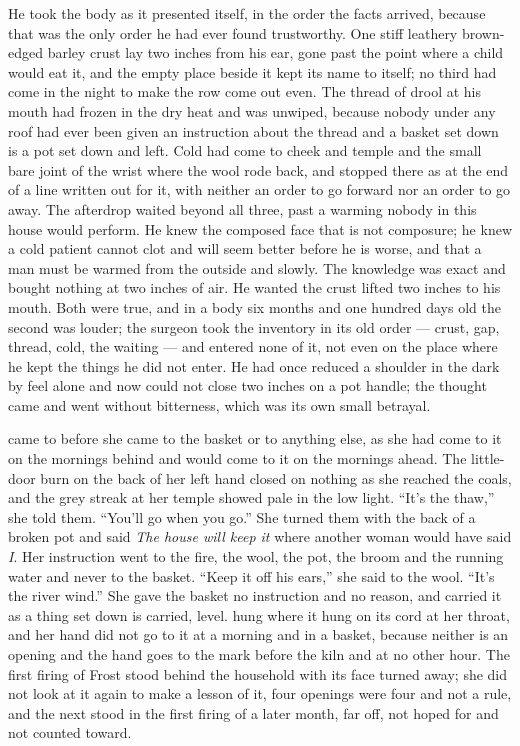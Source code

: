 He took the body as it presented itself, in the order the facts arrived, because that was the only order he had ever found trustworthy. One stiff leathery brown-edged barley crust lay two inches from his ear, gone past the point where a child would eat it, and the empty place beside it kept its name to itself; no third had come in the night to make the row come out even. The thread of drool at his mouth had frozen in the dry heat and was unwiped, because nobody under any roof had ever been given an instruction about the thread and a basket set down is a pot set down and left. Cold had come to cheek and temple and the small bare joint of the wrist where the wool rode back, and stopped there as at the end of a line written out for it, with neither an order to go forward nor an order to go away. The afterdrop waited beyond all three, past a warming nobody in this house would perform. He knew the composed face that is not composure; he knew a cold patient cannot clot and will seem better before he is worse, and that a man must be warmed from the outside and slowly. The knowledge was exact and bought nothing at two inches of air. He wanted the crust lifted two inches to his mouth. Both were true, and in a body six months and one hundred days old the second was louder; the surgeon took the inventory in its old order --- crust, gap, thread, cold, the waiting --- and entered none of it, not even on the place where he kept the things he did not enter. He had once reduced a shoulder in the dark by feel alone and now could not close two inches on a pot handle; the thought came and went without bitterness, which was its own small betrayal.

 came to  before she came to the basket or to anything else, as she had come to it on the mornings behind and would come to it on the mornings ahead. The little-door burn on the back of her left hand closed on nothing as she reached the coals, and the grey streak at her temple showed pale in the low light. “It’s the thaw,” she told them. “You’ll go when you go.” She turned them with the back of a broken pot and said \emph{The house will keep it} where another woman would have said \emph{I}. Her instruction went to the fire, the wool, the pot, the broom and the running water and never to the basket. “Keep it off his ears,” she said to the wool. “It’s the river wind.” She gave the basket no instruction and no reason, and carried it as a thing set down is carried, level.  hung where it hung on its cord at her throat, and her hand did not go to it at a morning and in a basket, because neither is an opening and the hand goes to the mark before the kiln and at no other hour. The first firing of Frost stood behind the household with its face turned away; she did not look at it again to make a lesson of it, four openings were four and not a rule, and the next stood in the first firing of a later month, far off, not hoped for and not counted toward.

